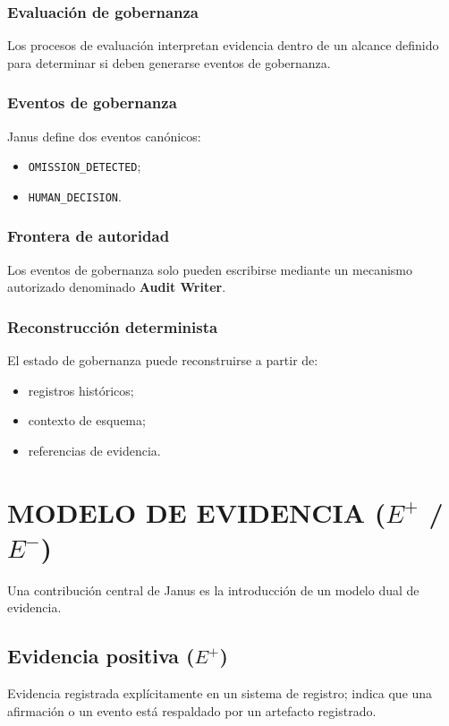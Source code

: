 \documentclass[conference]{IEEEtran}
\begin{document}
\subsubsection{Evaluación de gobernanza}
Los procesos de evaluación interpretan evidencia dentro de un alcance definido para determinar si deben generarse eventos de gobernanza.

\subsubsection{Eventos de gobernanza}
Janus define dos eventos canónicos:
\begin{itemize}
  \item \texttt{OMISSION\_DETECTED};
  \item \texttt{HUMAN\_DECISION}.
\end{itemize}

\subsubsection{Frontera de autoridad}
Los eventos de gobernanza solo pueden escribirse mediante un mecanismo autorizado denominado \textbf{Audit Writer}.

\subsubsection{Reconstrucción determinista}
El estado de gobernanza puede reconstruirse a partir de:
\begin{itemize}
  \item registros históricos;
  \item contexto de esquema;
  \item referencias de evidencia.
\end{itemize}

\section{MODELO DE EVIDENCIA (\texorpdfstring{$E^{+}$ / $E^{-}$}{E+ / E-})}
Una contribución central de Janus es la introducción de un modelo dual de evidencia.

\subsection{Evidencia positiva (\texorpdfstring{$E^{+}$}{E+})}
Evidencia registrada explícitamente en un sistema de registro; indica que una afirmación o un evento está respaldado por un artefacto registrado.
\end{document}
